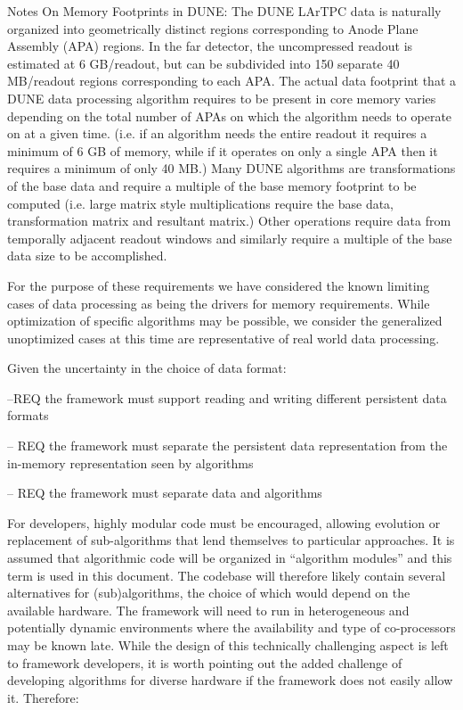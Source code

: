 \documentclass[../main-v1.tex]{subfiles}
\begin{document}
Notes On Memory Footprints in DUNE:
The DUNE LArTPC data is naturally organized into geometrically distinct regions corresponding to Anode Plane Assembly (APA) regions.  In the far detector, the uncompressed readout is estimated at 6 GB/readout, but can be subdivided into 150 separate 40 MB/readout regions corresponding to each APA.  The actual data footprint that a DUNE data processing algorithm requires to be present in core memory varies depending on the total number of APAs on which the algorithm needs to operate on at a given time.  (i.e. if an algorithm needs the entire readout it requires a minimum of 6 GB of memory, while if it operates on only a single APA then it requires a minimum of only 40 MB.)   Many DUNE algorithms are transformations of the base data and require a multiple of the base memory footprint to be computed (i.e. large matrix style multiplications require the base data, transformation matrix and resultant matrix.)  Other operations require data from temporally adjacent readout windows and similarly require a multiple of the base data size to be accomplished.

For the purpose of these requirements we have considered the known limiting cases of data processing as being the drivers for memory requirements.  While optimization of specific algorithms may be possible, we consider the generalized unoptimized cases at this time are representative of real world data processing.

Given the uncertainty in the choice of data format:

--REQ the framework must support reading and writing different persistent data formats

-- REQ the framework must separate the persistent data representation from the in-memory representation seen by algorithms

-- REQ the framework must separate data and algorithms 

For developers, highly modular code must be encouraged, allowing evolution or replacement of sub-algorithms that lend themselves to particular approaches.  It is assumed that algorithmic code will be organized in “algorithm modules” and this term is used in this document.  The codebase will therefore likely contain several alternatives for (sub)algorithms, the choice of which would depend on the available hardware.  The framework will need to run in heterogeneous and potentially dynamic environments where the availability and type of co-processors may be known late.  While the design of this technically challenging aspect is left to framework developers, it is worth pointing out the added challenge of developing algorithms for diverse hardware if the framework does not easily allow it.  Therefore:
\end{document}
